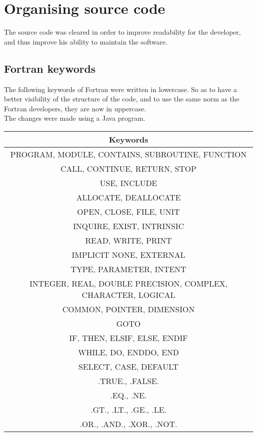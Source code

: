 \section{Organising source code}
The source code was cleared in order to improve readability for the developer, and thus improve his ability to maintain the software.

\newpage
\subsection{Fortran keywords}
The following keywords of Fortran were written in lowercase. So as to have a better visibility of the structure of the code, and to use the same norm as the Fortran developers, they are now in uppercase.
\\The changes were made using a Java program.

\begin{center}
\begin{tabular}{ | c | }
\hline 
\textbf{Keywords} \\

\hline 
PROGRAM, MODULE, CONTAINS, SUBROUTINE, FUNCTION \\
CALL, CONTINUE, RETURN, STOP \\
USE, INCLUDE \\
ALLOCATE, DEALLOCATE \\
OPEN, CLOSE, FILE, UNIT \\
INQUIRE, EXIST, INTRINSIC \\
READ, WRITE, PRINT \\

\hline 
IMPLICIT NONE, EXTERNAL \\
TYPE, PARAMETER, INTENT \\
INTEGER, REAL, DOUBLE PRECISION, COMPLEX, CHARACTER, LOGICAL \\
COMMON, POINTER, DIMENSION \\

\hline 
GOTO \\
IF, THEN, ELSIF, ELSE, ENDIF \\
WHILE, DO, ENDDO, END \\
SELECT, CASE, DEFAULT \\

\hline
.TRUE., .FALSE. \\
.EQ., .NE. \\
.GT., .LT., .GE., .LE. \\
.OR., .AND., .XOR., .NOT. \\

\hline
\end{tabular}
\end{center}

